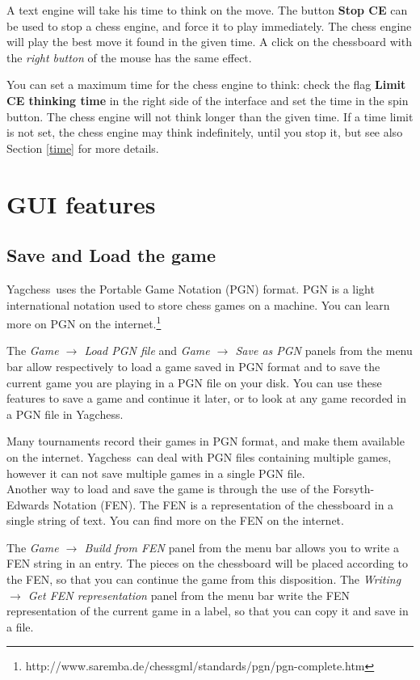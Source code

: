 \documentclass[a4paper]{article}
\newcommand{\nameprog}{Yagchess}
\begin{document}
A text engine will take his time to think on the move. The button \textbf{Stop CE} can be used to stop a chess engine, and force it to play immediately.
The chess engine will play the best move it found in the given time. A click on the chessboard with the \textit{right button} of the mouse has the same effect.

You can set a maximum time for the chess engine to think: check the flag \textbf{Limit CE thinking time} in the right side of the interface and set the time
in the spin button. The chess engine will not think longer than the given time. If a time limit is not set, the chess engine may think indefinitely, until
you stop it, but see also Section \ref{time} for more details.


\section{GUI features}
\label{gamefeat}
\subsection{Save and Load the game}
\label{saveload}
\nameprog\ uses the Portable Game Notation (PGN) format. PGN is a light international notation used to store chess games on a machine.
You can learn more on PGN on the internet.\footnote{http://www.saremba.de/chessgml/standards/pgn/pgn-complete.htm}

The \textit{Game $\rightarrow$ Load PGN file} and \textit{Game $\rightarrow$ Save as PGN} panels from the menu bar allow respectively to load a game saved in PGN format
and to save the current game you are playing in a PGN file on your disk. You can use these features to save a game and continue it later, or to look at any game recorded 
in a PGN file in \nameprog.

Many tournaments record their games in PGN format, and make them available on the internet. \nameprog\ can deal with PGN files containing multiple games, however it
can not save multiple games in a single PGN file.\\

Another way to load and save the game is through the use of the Forsyth-Edwards Notation (FEN). The FEN is a representation of the chessboard in a single string of text. You
can find more on the FEN on the internet.

The \textit{Game $\rightarrow$ Build from FEN} panel from the menu bar allows you to write a FEN string in an entry. The pieces on the chessboard will be placed according
to the FEN, so that you can continue the game from this disposition. The \textit{Writing $\rightarrow$ Get FEN representation} panel
from the menu bar write the FEN representation of the current game in a label, so that you can copy it and save in a file.
\end{document}
